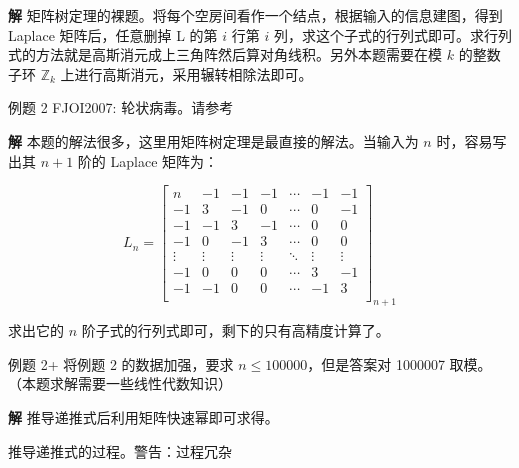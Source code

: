 \textbf{解} 矩阵树定理的裸题。将每个空房间看作一个结点，根据输入的信息建图，得到 Laplace 矩阵后，任意删掉 L 的第 $i$ 行第 $i$ 列，求这个子式的行列式即可。求行列式的方法就是高斯消元成上三角阵然后算对角线积。另外本题需要在模 $k$ 的整数子环 $\mathbb{Z}_k$ 上进行高斯消元，采用辗转相除法即可。

\begin{NOTE}{例题 2}{}
FJOI2007: 轮状病毒。请参考\href{https://www.lydsy.com/JudgeOnline/problem.php?id=1002}{}
\end{NOTE}


\textbf{解} 本题的解法很多，这里用矩阵树定理是最直接的解法。当输入为 $n$ 时，容易写出其 $n+1$ 阶的 Laplace 矩阵为：

$$
L_n = \begin{bmatrix}
n&	-1&	-1&	-1&	\cdots&	-1&	-1\\
-1&	3&	-1&	0&	\cdots&	0&	-1\\
-1&	-1&	3&	-1&	\cdots&	0&	0\\
-1&	0&	-1&	3&	\cdots&	0&	0\\
\vdots&	\vdots&	\vdots&	\vdots&	\ddots&	\vdots&	\vdots\\
-1&	0&	0&	0&	\cdots&	3&	-1\\
-1&	-1&	0&	0&	\cdots&	-1&	3\\
\end{bmatrix}_{n+1}
$$

求出它的 $n$ 阶子式的行列式即可，剩下的只有高精度计算了。

\begin{NOTE}{例题 2+}{}
将例题 2 的数据加强，要求 $n\leq 100000$，但是答案对 1000007 取模。（本题求解需要一些线性代数知识）
\end{NOTE}


\textbf{解} 推导递推式后利用矩阵快速幂即可求得。

\begin{DANGER}{推导递推式的过程。警告：过程冗杂}{}

\end{DANGER}


